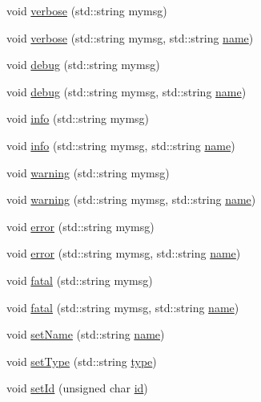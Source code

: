 \begin{DoxyCompactItemize}
\item 
void \hyperlink{classObject_a83d2db2df682907ea1115ad721c1c4a1}{verbose} (std\+::string mymsg)
\item 
void \hyperlink{classObject_a2d4120195317e2a3c6532e8bb9f3da68}{verbose} (std\+::string mymsg, std\+::string \hyperlink{classObject_a300f4c05dd468c7bb8b3c968868443c1}{name})
\item 
void \hyperlink{classObject_aac010553f022165573714b7014a15f0d}{debug} (std\+::string mymsg)
\item 
void \hyperlink{classObject_a6c9a0397ca804e04d675ed05683f5420}{debug} (std\+::string mymsg, std\+::string \hyperlink{classObject_a300f4c05dd468c7bb8b3c968868443c1}{name})
\item 
void \hyperlink{classObject_a644fd329ea4cb85f54fa6846484b84a8}{info} (std\+::string mymsg)
\item 
void \hyperlink{classObject_a1ca123253dfd30fc28b156f521dcbdae}{info} (std\+::string mymsg, std\+::string \hyperlink{classObject_a300f4c05dd468c7bb8b3c968868443c1}{name})
\item 
void \hyperlink{classObject_a65cd4fda577711660821fd2cd5a3b4c9}{warning} (std\+::string mymsg)
\item 
void \hyperlink{classObject_a11f101db4dd73d9391b0231818881d86}{warning} (std\+::string mymsg, std\+::string \hyperlink{classObject_a300f4c05dd468c7bb8b3c968868443c1}{name})
\item 
void \hyperlink{classObject_a204a95f57818c0f811933917a30eff45}{error} (std\+::string mymsg)
\item 
void \hyperlink{classObject_ad7f6c457733082efa2f9ff5f5c8e119a}{error} (std\+::string mymsg, std\+::string \hyperlink{classObject_a300f4c05dd468c7bb8b3c968868443c1}{name})
\item 
void \hyperlink{classObject_aad5a16aac7516ce65bd5ec02ab07fc80}{fatal} (std\+::string mymsg)
\item 
void \hyperlink{classObject_ae62acd3d09f716220f75f252dc38bc9a}{fatal} (std\+::string mymsg, std\+::string \hyperlink{classObject_a300f4c05dd468c7bb8b3c968868443c1}{name})
\item 
void \hyperlink{classObject_ae30fea75683c2d149b6b6d17c09ecd0c}{set\+Name} (std\+::string \hyperlink{classObject_a300f4c05dd468c7bb8b3c968868443c1}{name})
\item 
void \hyperlink{classObject_aae534cc9d982bcb9b99fd505f2e103a5}{set\+Type} (std\+::string \hyperlink{classObject_a84f99f70f144a83e1582d1d0f84e4e62}{type})
\item 
void \hyperlink{classObject_a398fe08cba594a0ce6891d59fe4f159f}{set\+Id} (unsigned char \hyperlink{classObject_af99145335cc61ff6e2798ea17db009d2}{id})

\end{DoxyCompactItemize}

